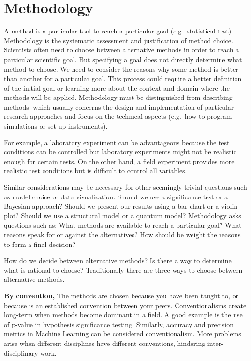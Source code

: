 \documentclass[
]{book}
\begin{document}
\hypertarget{methodology}{%
\section{Methodology}\label{methodology}}

A method is a particular tool to reach a particular goal (e.g.~statistical test). Methodology is the systematic assessment and justification of method choice. Scientists often need to choose between alternative methods in order to reach a particular scientific goal. But specifying a goal does not directly determine what method to choose. We need to consider the reasons why some method is better than another for a particular goal. This process could require a better definition of the initial goal or learning more about the context and domain where the methods will be applied. Methodology must be distinguished from describing methods, which usually concerns the design and implementation of particular research approaches and focus on the technical aspects (e.g.~how to program simulations or set up instruments).

For example, a laboratory experiment can be advantageous because the test conditions can be controlled but laboratory experiments might not be realistic enough for certain tests. On the other hand, a field experiment provides more realistic test conditions but is difficult to control all variables.

Similar considerations may be necessary for other seemingly trivial questions such as model choice or data visualization. Should we use a significance test or a Bayesian approach? Should we present our results using a bar chart or a violin plot? Should we use a structural model or a quantum model? Methodology asks questions such as: What methods are available to reach a particular goal? What reasons speak for or against the alternatives? How should be weight the reasons to form a final decision?

How do we decide between alternative methods? Is there a way to determine what is rational to choose?
Traditionally there are three ways to choose between alternative methods.

\textbf{By convention,} The methods are chosen because you have been taught to, or because is an established convention between your peers. Conventionalisms create long-term when methods become dominant in a field. A good example is the use of p-value in hypothesis significance testing. Similarly, accuracy and precision metrics in Machine Learning can be considered conventionalism. More problems arise when different disciplines have different conventions, hindering inter-disciplinary work.
\end{document}
